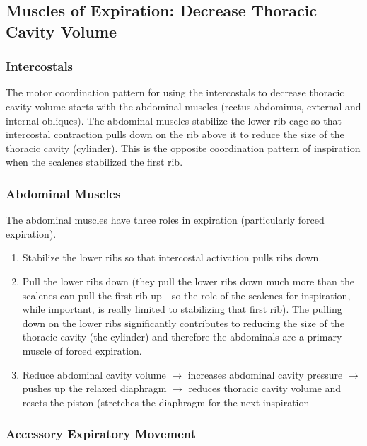 \subsection{Muscles of Expiration: Decrease Thoracic Cavity Volume}

\subsubsection{Intercostals}

The motor coordination pattern for using the intercostals to decrease thoracic cavity volume starts with the abdominal muscles (rectus abdominus, external and internal obliques). The abdominal muscles stabilize the lower rib cage so that intercostal contraction pulls down on the rib above it to reduce the size of the thoracic cavity (cylinder). This is the opposite coordination pattern of inspiration when the scalenes stabilized the first rib. 

\subsubsection{Abdominal Muscles}

The abdominal muscles have three roles in expiration (particularly forced expiration).

\begin{enumerate}
\item Stabilize the lower ribs so that intercostal activation pulls ribs down.
\item Pull the lower ribs down (they pull the lower ribs down much more than the scalenes can pull the first rib up - so the role of the scalenes for inspiration, while important, is really limited to stabilizing that first rib). The pulling down on the lower ribs significantly contributes to reducing the size of the thoracic cavity (the cylinder) and therefore the abdominals are a primary muscle of forced expiration.
\item Reduce abdominal cavity volume $\rightarrow$ increases abdominal cavity pressure $\rightarrow$ pushes up the relaxed diaphragm $\rightarrow$ reduces thoracic cavity volume and resets the piston (stretches the diaphragm for the next inspiration
\end{enumerate}

\subsubsection{Accessory Expiratory Movement}

